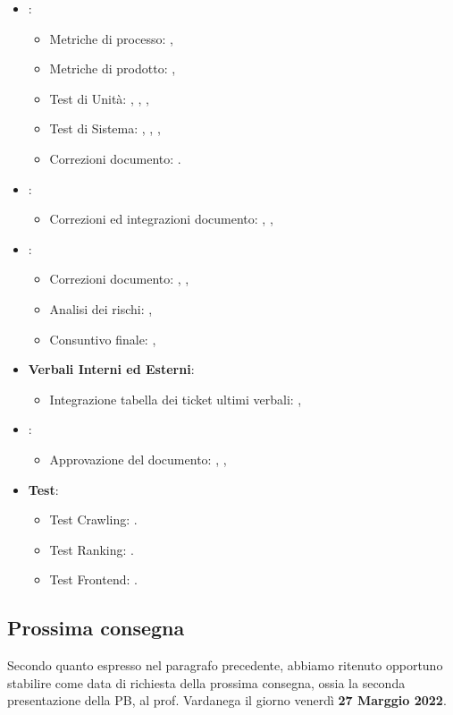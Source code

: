 \begin{itemize} 
\item \textbf{\PdQ}:
\begin{itemize}
\item Metriche di processo: \FP{},
\item Metriche di prodotto: \LW{},
\item Test di Unità: \FP{}, \GC{}, \MG{},
\item Test di Sistema: \FP{}, \GC{}, \MG{},
\item Correzioni documento: \FP{}.
\end{itemize}
\item \textbf{\NdP}:
\begin{itemize}
\item Correzioni ed integrazioni documento: \MG{}, \PV{},
\end{itemize}
\item \textbf{\PdP}:
\begin{itemize}
\item Correzioni documento: \MB{}, \EP{},
\item Analisi dei rischi: \MB{},
\item Consuntivo finale: \EP{},
\end{itemize}
\item \textbf{Verbali Interni ed Esterni}:
\begin{itemize}
\item Integrazione tabella dei ticket ultimi verbali: \PV{},
\end{itemize}
\item \textbf{\MU}:
\begin{itemize}
\item Approvazione del documento: \FP{}, \MG{},
\end{itemize}
\item \textbf{Test}:
\begin{itemize}
\item Test Crawling: \FP{}.
\item Test Ranking: \MG{}.
\item Test Frontend: \GC{}.
\end{itemize}
\end{itemize}

\subsection{Prossima consegna}

Secondo quanto espresso nel paragrafo precedente, abbiamo ritenuto opportuno stabilire come data di richiesta della prossima consegna, ossia la seconda presentazione della PB, al prof. Vardanega il giorno venerdì \textbf{27 Marggio 2022}. 


